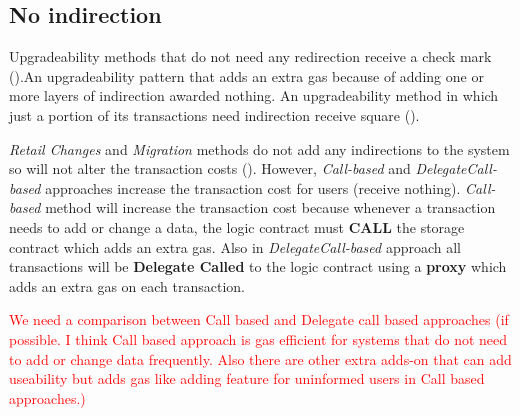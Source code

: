  

 \subsection{No indirection}
 
 
 Upgradeability methods that do not need any redirection receive a check mark (\checkmark).An upgradeability pattern that adds an extra gas because of adding one or more layers of indirection awarded nothing. An upgradeability method in which just a portion of its transactions need indirection receive square (\XBox). 

\textit{Retail Changes} and \textit{Migration} methods do not add any indirections to the system so will not alter the transaction costs (\checkmark). However, \textit{Call-based} and \textit{DelegateCall-based} approaches increase the transaction cost for users (receive nothing). \textit{Call-based} method will increase the transaction cost because whenever a transaction needs to add or change a data, the logic contract must \textbf{CALL} the storage contract which adds an extra gas. Also in \textit{DelegateCall-based} approach all transactions will be \textbf{Delegate Called} to the logic contract using a \textbf{proxy} which adds an extra gas on each transaction. 

\textcolor{red}{We need a comparison between Call based and Delegate call based approaches (if possible. I think Call based approach is gas efficient for systems that do not need to add or change data frequently. Also there are other extra adds-on that can add useability but adds gas like adding feature for uninformed users in Call based approaches.)}


